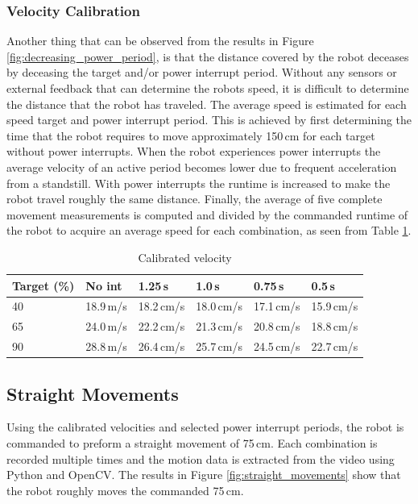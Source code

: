 \subsubsection{Velocity Calibration}
Another thing that can be observed from the results in Figure \ref{fig:decreasing_power_period}, is that the distance covered by the robot deceases by deceasing the target and/or power interrupt period.
Without any sensors or external feedback that can determine the robots speed, it is difficult to determine the distance that the robot has traveled.
The average speed is estimated for each speed target and power interrupt period.
This is achieved by first determining the time that the robot requires to move approximately 150\,cm for each target without power interrupts.
When the robot experiences power interrupts the average velocity of an active period becomes lower due to frequent acceleration from a standstill.
With power interrupts the runtime is increased to make the robot travel roughly the same distance.
Finally, the average of five complete movement measurements is computed and divided by the commanded runtime of the robot to acquire an average speed for each combination, as seen from Table \ref{tab:val_calib}.


\begin{table}[t]
	\centering
	\small
	\caption{Calibrated velocity}
	\label{tab:val_calib}
	\begin{tabular}{|l|l|l|l|l|l|}
		\hline
		Target (\%) & No int & 1.25\,s & 1.0\,s & 0.75\,s & 0.5\,s \\
		\hline \hline
		 40 & 18.9\,m/s & 18.2\,cm/s & 18.0\,cm/s & 17.1\,cm/s & 15.9\,cm/s \\
	     65 & 24.0\,m/s & 22.2\,cm/s & 21.3\,cm/s & 20.8\,cm/s & 18.8\,cm/s \\
		 90 & 28.8\,m/s & 26.4\,cm/s & 25.7\,cm/s & 24.5\,cm/s & 22.7\,cm/s \\
		\hline
	\end{tabular}
\end{table}

\subsection{Straight Movements}

Using the calibrated velocities and selected power interrupt periods, the robot is commanded to preform a straight movement of 75\,cm.
Each combination is recorded multiple times and the motion data is extracted from the video using Python and OpenCV.
The results in Figure \ref{fig:straight_movements} show that the robot roughly moves the commanded 75\,cm.

